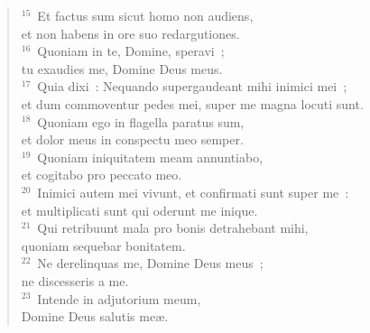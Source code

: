 \begin{flushleft}
\begin{verse}
${}^{15}$~Et factus sum sicut homo non audiens,\\ et non habens in ore suo redargutiones.\\
${}^{16}$~Quoniam in te, Domine, speravi~;\\ tu exaudies me, Domine Deus meus.\\
${}^{17}$~Quia dixi~: Nequando supergaudeant mihi inimici mei~;\\ et dum commoventur pedes mei, super me magna locuti sunt.\\
${}^{18}$~Quoniam ego in flagella paratus sum,\\ et dolor meus in conspectu meo semper.\\
${}^{19}$~Quoniam iniquitatem meam annuntiabo,\\ et cogitabo pro peccato meo.\\
${}^{20}$~Inimici autem mei vivunt, et confirmati sunt super me~:\\ et multiplicati sunt qui oderunt me inique.\\
${}^{21}$~Qui retribuunt mala pro bonis detrahebant mihi,\\ quoniam sequebar bonitatem.\\
${}^{22}$~Ne derelinquas me, Domine Deus meus~;\\ ne discesseris a me.\\
${}^{23}$~Intende in adjutorium meum,\\ Domine Deus salutis me\ae .\end{verse}\end{flushleft}



